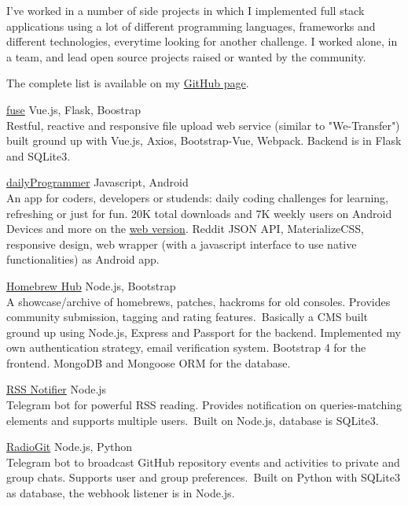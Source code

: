 \documentclass[11pt]{res} %
\begin{document}
\begin{resume}
I've worked in a number of side projects in which I implemented full stack applications using a lot of different programming languages, frameworks and different technologies, everytime looking for another challenge. I worked alone, in a team, and lead open source projects raised or wanted by the community.

The complete list is available on my \href{https://github.com/avivace}{GitHub page}.

{\sbb \href{https://github.com/avivace/fuse}{fuse}} \hfill 
Vue.js, Flask, Boostrap \\
Restful, reactive and responsive file upload web service (similar to "We-Transfer") built ground up with Vue.js, Axios, Bootstrap-Vue, Webpack. Backend is in Flask and SQLite3.

{\sbb \href{https://play.google.com/store/apps/details?id=avivace.daily_programmer}{dailyProgrammer} } \hfill 
Javascript, Android \\
An app for coders, developers or studends: daily coding challenges for learning, refreshing or just for fun.
20K total downloads and 7K weekly users on Android Devices and more on the \href{https://dp.avivace.com/}{web version}.
Reddit JSON API, MaterializeCSS, responsive design, web wrapper (with a javascript interface to use native functionalities) as Android app.

{\sbb \href{https://gbhh.avivace.com}{Homebrew Hub}} \hfill 
Node.js, Bootstrap \\ 
A showcase/archive of homebrews, patches, hackroms for old consoles. Provides community submission, tagging and rating features.\
Basically a CMS built ground up using Node.js, Express and Passport for the backend. Implemented my own authentication strategy, email verification system. Bootstrap 4 for the frontend. MongoDB and Mongoose ORM for the database.

{\sbb \href{https://github.com/avivace/rssnotifier}{RSS Notifier}} \hfill 
Node.js \\ 
Telegram bot for powerful RSS reading. Provides notification on queries-matching elements and supports multiple users.\ Built on Node.js, database is SQLite3.

{\sbb \href{https://github.com/avivace/radiogit}{RadioGit}} \hfill 
Node.js, Python \\ 
Telegram bot to broadcast GitHub repository events and activities to private and group chats. Supports user and group preferences.\
Built on Python with SQLite3 as database, the webhook listener is in Node.js.


\end{resume}
\end{document}
